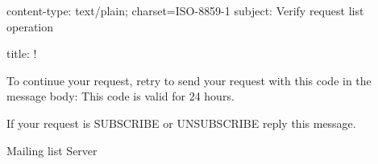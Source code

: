 content-type: text/plain; charset=ISO-8859-1
subject: Verify request list operation

title:  !

To continue your request, retry to send your request with this code in the message body:
This code is valid for 24 hours.

If your request is SUBSCRIBE or UNSUBSCRIBE reply this message.

Mailing list %
Server %